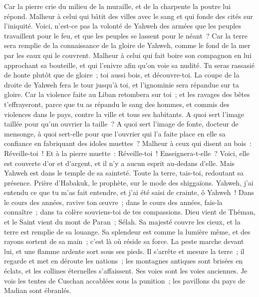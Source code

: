 \begin{multicols}{2}
Car la pierre crie du milieu de la muraille, et de la charpente la poutre lui répond.
Malheur à celui qui bâtit des villes avec le sang et qui fonde des cités sur l'iniquité.
Voici, n'est-ce pas la volonté de Yahweh des armées que les peuples travaillent pour le feu, et que les peuples se lassent pour le néant~?
Car la terre sera remplie de la connaissance de la gloire de Yahweh, comme le fond de la mer par les eaux qui le couvrent.
Malheur à celui qui fait boire son compagnon en lui approchant sa bouteille, et qui l'enivre afin qu'on voie sa nudité.
Tu seras rassasié de honte plutôt que de gloire~; toi aussi bois, et découvre-toi. La coupe de la droite de Yahweh fera le tour jusqu'à toi, et l'ignominie sera répandue sur ta gloire.
Car la violence faite au Liban retombera sur toi~; et les ravages des bêtes t'effrayeront, parce que tu as répandu le sang des hommes, et commis des violences dans le pays, contre la ville et tous ses habitants.
A quoi sert l'image taillée pour qu'un ouvrier la taille~? A quoi sert l'image de fonte, docteur de mensonge, à quoi sert-elle pour que l'ouvrier qui l'a faite place en elle sa confiance en fabriquant des idoles muettes~?
Malheur à ceux qui disent au bois~: Réveille-toi~! Et à la pierre muette~: Réveille-toi~! Enseignera-t-elle~? Voici, elle est couverte d'or et d'argent, et il n'y a aucun esprit au-dedans d'elle.
Mais Yahweh est dans le temple de sa sainteté. Toute la terre, tais-toi, redoutant sa présence.
\VerseOne{}Prière d'Habakuk, le prophète, sur le mode des shiggaïons.
Yahweh, j'ai entendu ce que tu m'as fait entendre, et j'ai été saisi de crainte, ô Yahweh~! Dans le cours des années, ravive ton œuvre~; dans le cours des années, fais-la connaître~; dans ta colère souviens-toi de tes compassions.
Dieu vient de Théman, et le Saint vient du mont de Paran~; Sélah. Sa majesté couvre les cieux, et la terre est remplie de sa louange.
Sa splendeur est comme la lumière même, et des rayons sortent de sa main~; c'est là où réside sa force.
La peste marche devant lui, et une flamme ardente sort sous ses pieds.
Il s'arrête et mesure la terre~; il regarde et met en déroute les nations~; les montagnes antiques sont brisées en éclats, et les collines éternelles s'affaissent. Ses voies sont les voies anciennes.
Je vois les tentes de Cuschan accablées sous la punition~; les pavillons du pays de Madian sont ébranlés.

\end{multicols}
